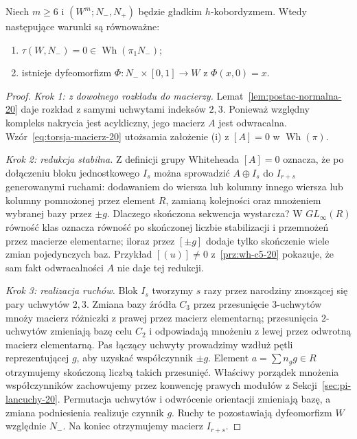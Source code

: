 \begin{twierdzenie}
\label{thm:s-kobordyzm-20}
Niech $m\geq6$ i $(W^m;N_-,N_+)$ będzie gładkim
$h$-kobordyzmem. Wtedy następujące warunki są równoważne:
\begin{enumerate}[label=(\roman*)]
 \item $\tau(W,N_-)=0\in\operatorname{Wh}(\pi_1N_-)$;
 \item istnieje dyfeomorfizm
 $\Phi:N_-\times[0,1]\to W$ z $\Phi(x,0)=x$.
\end{enumerate}
\end{twierdzenie}

\begin{proof}
\emph{Krok 1: z dowolnego rozkładu do macierzy.}
Lemat~\ref{lem:postac-normalna-20} daje rozkład
z samymi uchwytami indeksów $2,3$.
Ponieważ względny kompleks nakrycia jest
acykliczny, jego macierz $A$ jest odwracalna.
Wzór~\eqref{eq:torsja-macierz-20} utożsamia
założenie (i) z $[A]=0$ w $\operatorname{Wh}(\pi)$.

\emph{Krok 2: redukcja stabilna.}
Z definicji grupy Whiteheada $[A]=0$ oznacza,
że po dołączeniu bloku jednostkowego $I_s$
można sprowadzić $A\oplus I_s$ do $I_{r+s}$
generowanymi ruchami: dodawaniem do wiersza
lub kolumny innego wiersza lub kolumny
pomnożonej przez element $R$, zamianą kolejności
oraz mnożeniem wybranej bazy przez $\pm g$.
Dlaczego skończona sekwencja wystarcza?
W $GL_\infty(R)$ równość klas oznacza równość
po skończonej liczbie stabilizacji i przemnożeń
przez macierze elementarne; iloraz przez
$[\pm g]$ dodaje tylko skończenie wiele zmian
pojedynczych baz. Przykład
$[(u)]\ne0$ z~\ref{prz:wh-c5-20} pokazuje,
że sam fakt odwracalności $A$ nie daje tej redukcji.

\emph{Krok 3: realizacja ruchów.}
Blok $I_s$ tworzymy $s$ razy przez narodziny
znoszącej się pary uchwytów $2,3$. Zmiana bazy
źródła $C_3$ przez przesunięcie $3$-uchwytów
mnoży macierz różniczki z prawej przez macierz
elementarną; przesunięcia $2$-uchwytów zmieniają
bazę celu $C_2$ i odpowiadają mnożeniu z lewej
przez odwrotną macierz elementarną. Pas łączący
uchwyty prowadzimy wzdłuż pętli reprezentującej
$g$, aby uzyskać współczynnik $\pm g$. Element
$a=\sum n_g g\in R$ otrzymujemy skończoną
liczbą takich przesunięć. Właściwy porządek
mnożenia współczynników zachowujemy przez
konwencję prawych modułów z
Sekcji~\ref{sec:pi-lancuchy-20}. Permutacja
uchwytów i odwrócenie orientacji zmieniają
bazę, a zmiana podniesienia realizuje czynnik
$g$. Ruchy te pozostawiają dyfeomorfizm
$W$ względnie $N_-$.
Na koniec otrzymujemy macierz $I_{r+s}$.


\end{proof}
